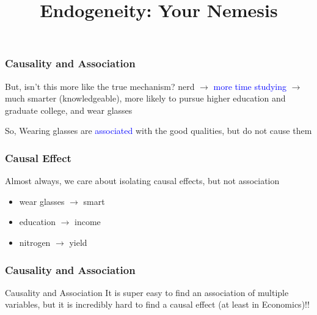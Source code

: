 \documentclass[fleqn]{beamer}\usepackage[]{graphicx}\usepackage[]{color}
\begin{document}
\begin{frame}[c]
  \frametitle{Causality and Association}
  \begin{block}{But, isn't this more like the true mechanism?}
    nerd $\rightarrow$ \textcolor{blue}{more time studying} $\rightarrow$ much smarter (knowledgeable), more likely to pursue higher education and graduate college, and wear glasses
  \end{block}

  \begin{block}{So,}
    Wearing glasses are \textcolor{blue}{associated} with the good qualities, but do not cause them
  \end{block}

\end{frame}

\begin{frame}[c]
  \frametitle{Causal Effect}
  Almost always, we care about isolating causal effects, but not association
  \begin{itemize}
    \item wear glasses $\rightarrow$ smart
    \item education $\rightarrow$ income
    \item nitrogen $\rightarrow$ yield
  \end{itemize}
\end{frame}


\title{Endogeneity: Your Nemesis}
\author{}
\date{}

\begin{frame}
\maketitle
\end{frame}

\begin{frame}[c]
  \frametitle{Causality and Association}
  \begin{block}{Causality and Association}
    It is super easy to find an association of multiple variables, but it is incredibly hard to find a causal effect (at least in Economics)!!
  \end{block}
\end{frame}
\end{document}
